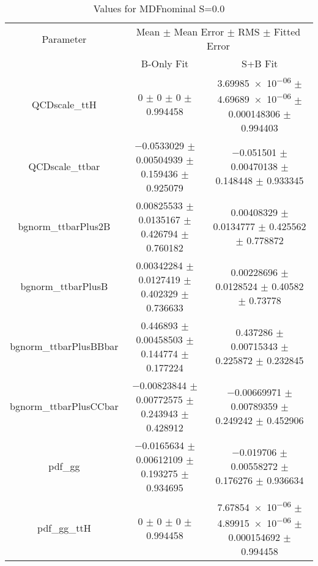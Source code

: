 \begin{table}
\centering
\caption{Values for MDFnominal S=0.0}
\begin{tabular}{ccc}
\toprule
Parameter & \multicolumn{2}{c}{Mean $\pm$ Mean Error $\pm$ RMS $\pm$ Fitted Error}\\
 & B-Only Fit & S+B Fit\\
\midrule
QCDscale\_ttH & \num{0} $\pm$ \num{0} $\pm$ \num{0} $\pm$ \num{0.994458} & \num{3.69985e-06} $\pm$ \num{4.69689e-06} $\pm$ \num{0.000148306} $\pm$ \num{0.994403}\\
QCDscale\_ttbar & \num{-0.0533029} $\pm$ \num{0.00504939} $\pm$ \num{0.159436} $\pm$ \num{0.925079} & \num{-0.051501} $\pm$ \num{0.00470138} $\pm$ \num{0.148448} $\pm$ \num{0.933345}\\
bgnorm\_ttbarPlus2B & \num{0.00825533} $\pm$ \num{0.0135167} $\pm$ \num{0.426794} $\pm$ \num{0.760182} & \num{0.00408329} $\pm$ \num{0.0134777} $\pm$ \num{0.425562} $\pm$ \num{0.778872}\\
bgnorm\_ttbarPlusB & \num{0.00342284} $\pm$ \num{0.0127419} $\pm$ \num{0.402329} $\pm$ \num{0.736633} & \num{0.00228696} $\pm$ \num{0.0128524} $\pm$ \num{0.40582} $\pm$ \num{0.73778}\\
bgnorm\_ttbarPlusBBbar & \num{0.446893} $\pm$ \num{0.00458503} $\pm$ \num{0.144774} $\pm$ \num{0.177224} & \num{0.437286} $\pm$ \num{0.00715343} $\pm$ \num{0.225872} $\pm$ \num{0.232845}\\
bgnorm\_ttbarPlusCCbar & \num{-0.00823844} $\pm$ \num{0.00772575} $\pm$ \num{0.243943} $\pm$ \num{0.428912} & \num{-0.00669971} $\pm$ \num{0.00789359} $\pm$ \num{0.249242} $\pm$ \num{0.452906}\\
pdf\_gg & \num{-0.0165634} $\pm$ \num{0.00612109} $\pm$ \num{0.193275} $\pm$ \num{0.934695} & \num{-0.019706} $\pm$ \num{0.00558272} $\pm$ \num{0.176276} $\pm$ \num{0.936634}\\
pdf\_gg\_ttH & \num{0} $\pm$ \num{0} $\pm$ \num{0} $\pm$ \num{0.994458} & \num{7.67854e-06} $\pm$ \num{4.89915e-06} $\pm$ \num{0.000154692} $\pm$ \num{0.994458}\\
\bottomrule
\end{tabular}
\end{table}
